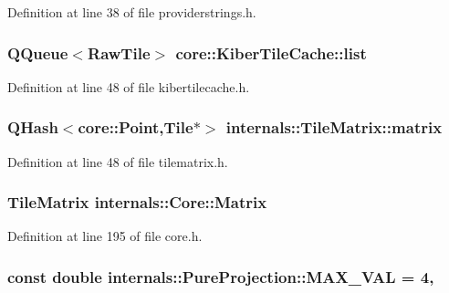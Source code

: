 Definition at line 38 of file providerstrings.\-h.

\hypertarget{group___o_p_map_widget_ga097b545fed7bd5b8be78160165f4f6f5}{
\subsubsection[{list}]{\setlength{\rightskip}{0pt plus 5cm}Q\-Queue$<$Raw\-Tile$>$ core\-::\-Kiber\-Tile\-Cache\-::list}}\label{group___o_p_map_widget_ga097b545fed7bd5b8be78160165f4f6f5}


Definition at line 48 of file kibertilecache.\-h.

\hypertarget{group___o_p_map_widget_gaecc6fdfe28242560867ab83c02820b20}{
\subsubsection[{matrix}]{\setlength{\rightskip}{0pt plus 5cm}Q\-Hash$<${\bf core\-::\-Point},Tile$\ast$$>$ internals\-::\-Tile\-Matrix\-::matrix\hspace{0.3cm}{\ttfamily [protected]}}}\label{group___o_p_map_widget_gaecc6fdfe28242560867ab83c02820b20}


Definition at line 48 of file tilematrix.\-h.

\hypertarget{group___o_p_map_widget_ga4ac91c5f728a51e821a9cec0abf347fd}{
\subsubsection[{Matrix}]{\setlength{\rightskip}{0pt plus 5cm}Tile\-Matrix internals\-::\-Core\-::\-Matrix}}\label{group___o_p_map_widget_ga4ac91c5f728a51e821a9cec0abf347fd}


Definition at line 195 of file core.\-h.

\hypertarget{group___o_p_map_widget_ga34e30a80435ba07c4e95b56f24935ceb}{
\subsubsection[{M\-A\-X\-\_\-\-V\-A\-L}]{\setlength{\rightskip}{0pt plus 5cm}const {\bf double} internals\-::\-Pure\-Projection\-::\-M\-A\-X\-\_\-\-V\-A\-L = 4\hspace{0.3cm}{\ttfamily [static]}, {\ttfamily [protected]}}}\label{group___o_p_map_widget_ga34e30a80435ba07c4e95b56f24935ceb}


